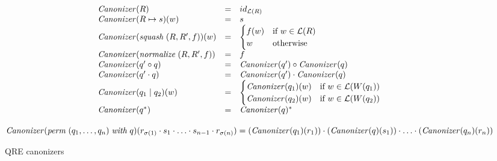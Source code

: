 \documentclass{svproc}
\newcommand{\squash}[3]{\ensuremath{\mathit{squash} \; (#1, #2, #3)}}
\newcommand{\perm}[2]{\ensuremath{\mathit{perm}\; (#1)\; \mathit{with}\; #2}}
\newcommand{\normalize}[3]{\ensuremath{\mathit{normalize} \; (#1, #2, #3)}}
\newcommand{\sep}{\ensuremath{\; | \;}}
\newcommand{\canonizer}{\ensuremath{\mathit{Canonizer}}}
\begin{document}
\begin{figure}[t]
  \begin{center}
\[
    \begin{array}{l@\quad l @\quad l} 
      \canonizer(R) &=& id_{\mathcal{L}(R)} \\
      \canonizer(R \mapsto s)(w) &=& s\\
      \canonizer(\squash{R}{R'}{f})(w) &=& 
\begin{cases}
f(w) & \text{if } w \in \mathcal{L}(R)\\
w & \text{otherwise}
\end{cases}\\
      \canonizer(\normalize{R}{R'}{f}) &=& f\\
      \canonizer(q' \circ q) &=& \canonizer(q') \circ \canonizer(q)\\
      \canonizer(q' \cdot q) &=& \canonizer(q') \cdot \canonizer(q)\\
      \canonizer(q_1 \sep q_2)(w) &=& 
\begin{cases}
\canonizer(q_1)(w) & \text{if } w \in \mathcal{L}(W(q_1))\\
\canonizer(q_2)(w) & \text{if } w \in \mathcal{L}(W(q_2))\\
\end{cases}\\
      \canonizer(q^*) &=& \canonizer(q)^* \\
    \end{array}
    \]
    \end{center}
    $\canonizer(\perm{q_1, \ldots, q_n}{q})(r_{\sigma(1)}
\cdot s_1 \cdot \ldots \cdot s_{n-1} \cdot r_{\sigma(n)}) \newline
= (\canonizer(q_1)(r_1)) \cdot (\canonizer(q)(s_1)) \cdot \ldots \cdot
(\canonizer(q_n)(r_n))$
  \caption{QRE canonizers}
  \label{fig:canonizers}
\end{figure}
\end{document}

